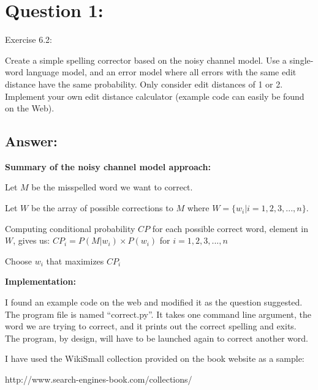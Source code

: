 \section*{Question 1:}
Exercise 6.2: 

Create a simple spelling corrector based on the noisy channel model. Use a single-word language model, and an error model where all errors with the same edit distance have the same probability. Only consider edit distances of 1 or 2. Implement your own edit distance calculator (example code can easily be found on the Web).

\subsection*{Answer:}

\textbf{Summary of the noisy channel model approach:}

Let $M$ be the misspelled word we want to correct.

Let $W$ be the array of possible corrections to $M$ where $W = \{w_i | i = 1, 2, 3, ..., n\}$.

Computing conditional probability $CP$ for each possible correct word, element in $W$, gives us: $CP_i = P(M|w_i) \times P(w_i)$ for $i = 1, 2, 3, ..., n$

Choose $w_i$ that maximizes $CP_i$

\textbf{Implementation:}

I found an example code on the web and modified it as the question suggested. The program file is named ``correct.py''. It takes one command line argument, the word we are trying to correct, and it prints out the correct spelling and exits. The program, by design, will have to be launched again to correct another word. 



I have used the WikiSmall collection provided on the book website as a sample:

http://www.search-engines-book.com/collections/


